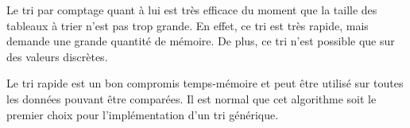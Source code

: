 \documentclass[11pt]{article}
\begin{document}
Le tri par comptage quant à lui est très efficace du moment que la taille des tableaux à trier n'est pas trop grande. En effet, ce tri est très rapide, mais demande une grande quantité de mémoire. De plus, ce tri n'est possible que sur des valeurs discrètes.

Le tri rapide est un bon compromis temps-mémoire et peut être utilisé sur toutes les données pouvant être comparées. Il est normal que cet algorithme soit le premier choix pour l'implémentation d'un tri générique. 



\end{document}
